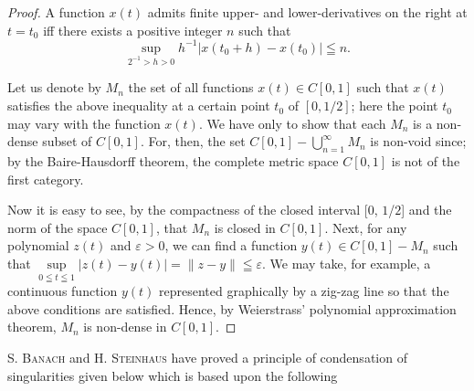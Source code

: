 \begin{proof}
 A function $x(t)$ admits finite upper- and lower-derivatives on the right at $t = t_{0}$ iff there exists a positive integer $n$ such that 
\[
\sup\limits _ {2 ^{-1} > h > 0} h ^{-1} \left| x \left(t _{0} + h\right) - x \left(t _{0}\right) \right| \leqq n. \]

Let us denote by $M_{n}$ the set of all functions $x(t) \in C[0,1]$ such that $x(t)$ satisfies the above inequality at a certain point $t_0$ of $[0,1/2]$; here the point $t_0$ may vary with the function $x(t)$. We have only to show that each $M_{n}$ is a non-dense subset of $C[0,1]$. For, then, the set $C[0,1] - \bigcup_{n=1}^{\infty} M_{n}$ is non-void since; by the Baire-Hausdorff theorem, the complete metric space $C[0,1]$ is not of the first category. 

Now it is easy to see, by the compactness of the closed interval [$0$, $1$/$2$] and the norm of the space $C[0,1]$, that $M_{n}$ is closed in $C[0,1]$. Next, for any polynomial $z(t)$ and $\varepsilon > 0$, we can find a function $y(t) \in C[0,1] - M_{n}$ such that $\sup\limits_{0 \leqq t \leqq 1} |z(t) - y(t)| = \|z - y\| \leqq \varepsilon$. We may take, for example, a continuous function $y(t)$ represented graphically by a zig-zag line so that the above conditions are satisfied. Hence, by Weierstrass' polynomial approximation theorem, $M_{n}$ is non-dense in $C[0,1]$. 
\end{proof}

S. \textsc{Banach} \cite{banach9} and H. \textsc{Steinhaus} have proved a principle of condensation of singularities given below which is based upon the following 

